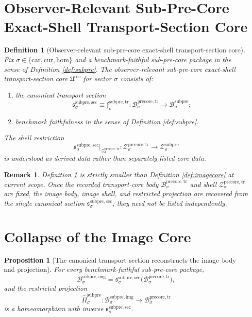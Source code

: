 \documentclass[11pt]{article}
\newcommand{\Car}{\mathrm{car}}
\newcommand{\Cur}{\mathrm{cur}}
\newcommand{\Hom}{\mathrm{hom}}
\newcommand{\PreCoreTrBody}[1]{\mathcal B_{#1}^{\mathrm{precore,tr}}}
\newcommand{\PreCoreTrShell}[1]{\mathcal Z_{#1}^{\mathrm{precore,tr}}}
\newcommand{\SubPreCoreBody}[1]{\mathcal B_{#1}^{\mathrm{subpre}}}
\newcommand{\SubPreCoreTransportMin}[1]{\mathfrak f_{#1}^{\mathrm{subpre,tr}}}
\newcommand{\SubPreCoreShellSet}[1]{\mathcal Z_{#1}^{\mathrm{subpre}}}
\newcommand{\SubPreImgBody}[1]{\mathcal B_{#1}^{\mathrm{subpre,img}}}
\newcommand{\SubPreImgProj}[1]{\widehat{\Pi}_{#1}^{\mathrm{subpre}}}
\newcommand{\SubPreSectionCore}{\mathfrak U^{\mathrm{sec}}}
\newcommand{\SubPreSection}[1]{\mathfrak s_{#1}^{\mathrm{subpre,sec}}}
\newtheorem{definition}{Definition}
\newtheorem{proposition}{Proposition}
\newtheorem{remark}{Remark}
\begin{document}
\section{Observer-Relevant Sub-Pre-Core Exact-Shell Transport-Section Core}

\begin{definition}[Observer-relevant sub-pre-core exact-shell transport-section core]
\label{def:sectioncore}
Fix \(\sigma\in\{\Car,\Cur,\Hom\}\) and a benchmark-faithful sub-pre-core package in the sense of Definition \ref{def:subpre}. The \emph{observer-relevant sub-pre-core exact-shell transport-section core} \(\SubPreSectionCore\) for sector \(\sigma\) consists of:
\begin{enumerate}
    \item the canonical transport section
    \[
    \SubPreSection{\sigma}
    \equiv
    \SubPreCoreTransportMin{\sigma}
    :
    \PreCoreTrBody{\sigma}\to\SubPreCoreBody{\sigma};
    \]
    \item benchmark faithfulness in the sense of Definition \ref{def:subpre}.
\end{enumerate}
The shell restriction
\[
\SubPreSection{\sigma}\big|_{\PreCoreTrShell{\sigma}}
:
\PreCoreTrShell{\sigma}\to\SubPreCoreShellSet{\sigma}
\]
is understood as derived data rather than separately listed core data.
\end{definition}

\begin{remark}
Definition \ref{def:sectioncore} is strictly smaller than Definition \ref{def:imagecore} at current scope. Once the recorded transport-core body \(\PreCoreTrBody{\sigma}\) and shell \(\PreCoreTrShell{\sigma}\) are fixed, the image body, image shell, and restricted projection are recovered from the single canonical section \(\SubPreSection{\sigma}\); they need not be listed independently.
\end{remark}

\section{Collapse of the Image Core}

\begin{proposition}[The canonical transport section reconstructs the image body and projection]
\label{prop:reconstructbody}
For every benchmark-faithful sub-pre-core package,
\[
\SubPreImgBody{\sigma}
=
\SubPreSection{\sigma}\bigl(\PreCoreTrBody{\sigma}\bigr),
\]
and the restricted projection
\[
\SubPreImgProj{\sigma}:\SubPreImgBody{\sigma}\to\PreCoreTrBody{\sigma}
\]
is a homeomorphism with inverse \(\SubPreSection{\sigma}\).
\end{proposition}
\end{document}

